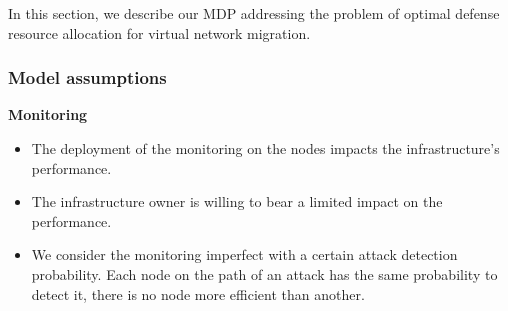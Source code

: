 \label{sec:mdp-model}
In this section, we describe our MDP addressing the problem of optimal defense resource allocation for virtual network migration.

\subsubsection{Model assumptions}
\label{sec:mdp-model-assumption}

\textbf{Monitoring}
\begin{itemize}
    \item The deployment of the monitoring on the nodes impacts the infrastructure's performance. 
    
    \item The infrastructure owner is willing to bear a limited impact on the performance.
    
    \item We consider the monitoring imperfect with a certain attack detection probability.
    Each node on the path of an attack has the same probability to detect it, \ie there is no node more efficient than another. 
\end{itemize}


